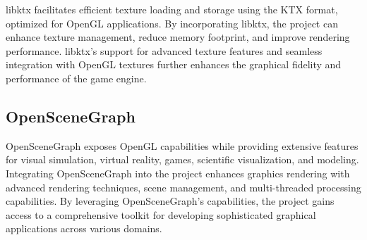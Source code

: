 libktx facilitates efficient texture loading and storage using the KTX format, optimized for OpenGL applications. By incorporating libktx, the project can enhance texture management, reduce memory footprint, and improve rendering performance. libktx's support for advanced texture features and seamless integration with OpenGL textures further enhances the graphical fidelity and performance of the game engine.

\subsection*{OpenSceneGraph}

OpenSceneGraph exposes OpenGL capabilities while providing extensive features for visual simulation, virtual reality, games, scientific visualization, and modeling. Integrating OpenSceneGraph into the project enhances graphics rendering with advanced rendering techniques, scene management, and multi-threaded processing capabilities. By leveraging OpenSceneGraph's capabilities, the project gains access to a comprehensive toolkit for developing sophisticated graphical applications across various domains.

